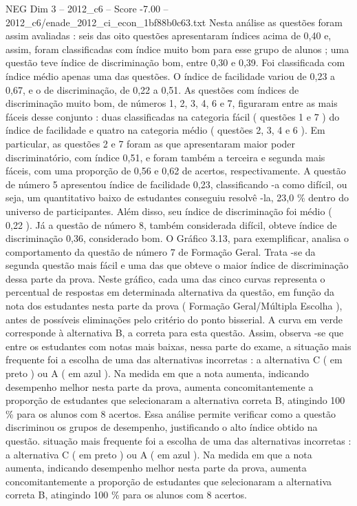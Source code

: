 \begin{textsample}{NEG Dim 3 – 2012\_c6 – Score -7.00 – 2012\_c6/enade\_2012\_ci\_econ\_1bf88b0c63.txt}
Nesta análise as questões foram assim avaliadas : seis das oito questões apresentaram índices acima de 0,40 e, assim, foram classificadas com índice muito bom para esse grupo de alunos ; uma questão teve índice de discriminação bom, entre 0,30 e 0,39.
Foi classificada com índice médio apenas uma das questões.
O índice de facilidade variou de 0,23 a 0,67, e o de discriminação, de 0,22 a 0,51.
As questões com índices de discriminação muito bom, de números 1, 2, 3, 4, 6 e 7, figuraram entre as mais fáceis desse conjunto : duas classificadas na categoria fácil ( questões 1 e 7 ) do índice de facilidade e quatro na categoria médio ( questões 2, 3, 4 e 6 ).
Em particular, as questões 2 e 7 foram as que apresentaram maior poder discriminatório, com índice 0,51, e foram também a terceira e segunda mais fáceis, com uma proporção de 0,56 e 0,62 de acertos, respectivamente.
A questão de número 5 apresentou índice de facilidade 0,23, classificando -a como difícil, ou seja, um quantitativo baixo de estudantes conseguiu resolvê -la, 23,0 \% dentro do universo de participantes.
Além disso, seu índice de discriminação foi médio ( 0,22 ).
Já a questão de número 8, também considerada difícil, obteve índice de discriminação 0,36, considerado bom.
O Gráfico 3.13, para exemplificar, analisa o comportamento da questão de número 7 de Formação Geral.
Trata -se da segunda questão mais fácil e uma das que obteve o maior índice de discriminação dessa parte da prova.
Neste gráfico, cada uma das cinco curvas representa o percentual de respostas em determinada alternativa da questão, em função da nota dos estudantes nesta parte da prova ( Formação Geral/Múltipla Escolha ), antes de possíveis eliminações pelo critério do ponto bisserial.
A curva em verde corresponde à alternativa B, a correta para esta questão.
Assim, observa -se que entre os estudantes com notas mais baixas, nessa parte do exame, a situação mais frequente foi a escolha de uma das alternativas incorretas : a alternativa C ( em preto ) ou A ( em azul ).
Na medida em que a nota aumenta, indicando desempenho melhor nesta parte da prova, aumenta concomitantemente a proporção de estudantes que selecionaram a alternativa correta B, atingindo 100 \% para os alunos com 8 acertos.
Essa análise permite verificar como a questão discriminou os grupos de desempenho, justificando o alto índice obtido na questão. situação mais frequente foi a escolha de uma das alternativas incorretas : a alternativa C ( em preto ) ou A ( em azul ).
Na medida em que a nota aumenta, indicando desempenho melhor nesta parte da prova, aumenta concomitantemente a proporção de estudantes que selecionaram a alternativa correta B, atingindo 100 \% para os alunos com 8 acertos.

\end{textsample}
